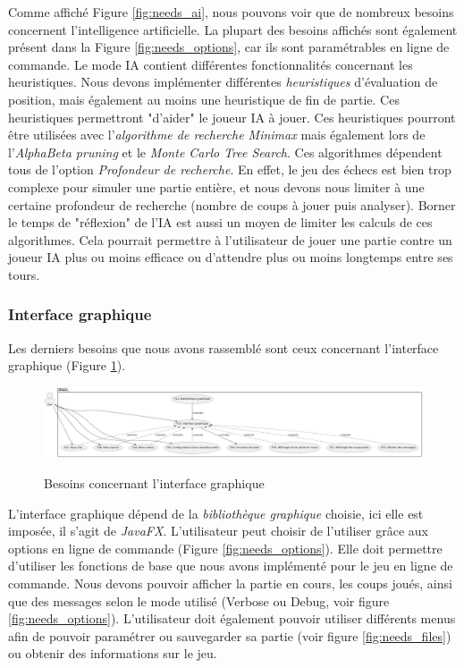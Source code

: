 \documentclass{article}
\begin{document}
Comme affiché Figure \ref{fig:needs_ai}, nous pouvons voir que de nombreux besoins
concernent l'intelligence artificielle.
La plupart des besoins affichés sont également présent dans la Figure \ref{fig:needs_options}, car ils sont paramétrables
en ligne de commande.
Le mode IA contient différentes fonctionnalités concernant les heuristiques. Nous devons implémenter différentes \textit{heuristiques}
d'évaluation de position, mais également au moins une heuristique de fin de partie. Ces heuristiques permettront "d'aider" le joueur IA
à jouer. Ces heuristiques pourront être utilisées avec l'\textit{algorithme de recherche Minimax} mais également lors de l'\textit{AlphaBeta pruning} 
et le \textit{Monte Carlo Tree Search}. Ces algorithmes dépendent tous de l'option \textit{Profondeur de recherche}. En effet, le jeu des échecs est bien 
trop complexe pour simuler une partie entière, et nous devons nous limiter à une certaine profondeur de recherche (nombre de coups à jouer puis analyser).
Borner le temps de "réflexion" de l'IA est aussi un moyen de limiter les calculs de ces algorithmes. Cela pourrait permettre à l'utilisateur de jouer une partie contre
un joueur IA plus ou moins efficace ou d'attendre plus ou moins longtemps entre ses tours.
\subsubsection{Interface graphique}
Les derniers besoins que nous avons rassemblé sont ceux concernant l'interface graphique (Figure \ref{fig:needs_gui}).
\begin{figure}[h]
    \caption{Besoins concernant l'interface graphique}
    \centering
    \includegraphics[width=\textwidth,height=\textheight,keepaspectratio]{needs_gui}
    \label{fig:needs_gui}
\end{figure}

L'interface graphique dépend de la \textit{bibliothèque graphique} choisie, ici elle est imposée, il s'agit de \textit{JavaFX}.
L'utilisateur peut choisir de l'utiliser grâce aux options en ligne de commande (Figure \ref{fig:needs_options}).
Elle doit permettre d'utiliser les fonctions de base que nous avons implémenté pour le jeu en ligne de commande. Nous devons 
pouvoir afficher la partie en cours, les coups joués, ainsi que des messages selon le mode utilisé (Verbose ou Debug, voir figure \ref{fig:needs_options}).
L'utilisateur doit également pouvoir utiliser différents menus afin de pouvoir paramétrer ou sauvegarder sa partie (voir figure \ref{fig:needs_files}) ou obtenir des informations sur le jeu.
\end{document}
